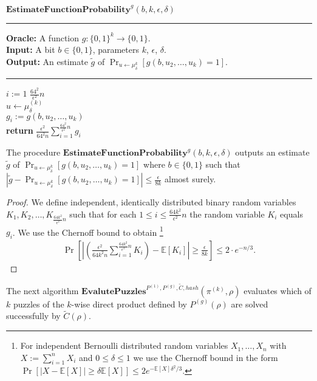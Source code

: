 \begin{codeblock}
  $\textbf{EstimateFunctionProbability}^{g}(b, k, \epsilon, \delta)$
  \medskip
  \hrule
  \medskip
  \textbf{Oracle:} A function $g : \{0,1\}^{k} \rightarrow \{0,1\}$.\\
  \textbf{Input:} A bit $b \in \{0,1\}$, parameters $k$, $\epsilon$, $\delta$. \\
  \textbf{Output:} An estimate $\widetilde{g}$ of $\Pr_{u \leftarrow \mu_{\delta}^{k}}[g(b,u_2, \dots, u_k) = 1]$.
  \medskip\hrule\medskip
  \For $i:=1$ \To $\frac{64^2}{\epsilon^2} n$ \Do \\
  \IndI $u \leftarrow \mu_{\delta}^{(k)}$ \\
  \IndI $g_i := g(b, u_2, \dots, u_k)$ \\
  \textbf{return} $\frac{\epsilon^2}{64^2n} \sum_{i=1}^{\frac{64^2}{\epsilon^2} n} g_i$
\end{codeblock}
%
\begin{lemma}
  \label{lemma:estimate_of_g}
  The procedure $\textbf{EstimateFunctionProbability}^{g}(b, k, \epsilon, \delta)$ outputs an estimate $\widetilde{g}$
  of $\Pr_{u \leftarrow \mu_{\delta}^k}[g(b, u_2, \dots, u_k) = 1]$ where $b \in \{0,1\}$
  such that $| \widetilde{g} - \Pr_{u \leftarrow \mu_{\delta}^{k}}\left[g(b,u_2, \dots, u_k) = 1\right] | \leq \frac{\epsilon}{8k}$ almost surely.
\end{lemma}
%
\begin{proof}
We define independent, identically distributed binary random variables $K_1, K_2, \dots, K_{\frac{64k^2}{\epsilon^2} n}$
such that for each $1 \leq i \leq \frac{64k^2}{\epsilon^2} n$
the random variable $K_i$ equals $g_i$. We use the Chernoff bound to obtain
\footnote{For independent Bernoulli distributed random variables $X_1, \dots, X_n$ with $X := \sum_{i=1}^n X_i$ and $0 \leq \delta \leq 1$
  we use the Chernoff bound in the form $\Pr[|X - \mathbb{E}[X]| \geq \delta \mathbb{E}[X]] \leq 2 e^{- \mathbb{E}[X] \delta^2 / 3}$.}
\begin{align*}
  \Pr \left[\left|\left(\frac{\epsilon^2}{64k^2n} \sum_{i=1}^{\frac{64k^2}{\epsilon^2}n } K_i \right) - \mathbb{E}[K_i]\right|
    \geq \frac{\epsilon}{8k} \right] \leq 2 \cdot e^{-n/3}.
\end{align*}
\end{proof}
%
%
The next algorithm $\textbf{EvalutePuzzles}^{P^{(1)}, P^{(g)}, \widetilde{C}, hash}(\pi^{(k)}, \rho)$
evaluates which of $k$ puzzles of the $k$-wise direct product defined by $P^{(g)}(\rho)$ are solved successfully by $\widetilde{C}(\rho)$.
